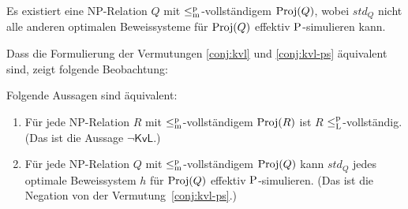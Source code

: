 \begin{conjecture}\label{conj:kvl-ps}
    Es existiert eine NP-Relation $Q$ mit $\leqmp$-vollständigem $\Proj(Q)$, wobei $\mathit{std}_Q$ nicht alle anderen optimalen Beweissysteme für $\Proj(Q)$ effektiv $\P$-simulieren kann.


\end{conjecture}
Dass die Formulierung der Vermutungen \ref{conj:kvl} und \ref{conj:kvl-ps} äquivalent sind, zeigt folgende Beobachtung:
\begin{observation}\label{obs:kvl-equiv}
    Folgende Aussagen sind äquivalent:
    \begin{enumerate}
        \item Für jede NP-Relation $R$ mit $\leqmp$-vollständigem $\Proj(R)$ ist $R$ $\leqlp$-vollständig. (Das ist die Aussage $\neg\mathsf{KvL}$.)
        \item Für jede NP-Relation $Q$ mit $\leqmp$-vollständigem $\Proj(Q)$ kann $\mathit{std}_Q$ jedes optimale Beweissystem $h$ für $\Proj(Q)$ effektiv $\P$-simulieren. (Das ist die Negation von der Vermutung~\ref{conj:kvl-ps}.)
    \end{enumerate}
\end{observation}

